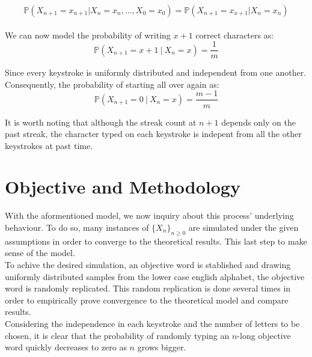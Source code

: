 \documentclass{article}
\newcommand{\SP}{\{X_n\}_{n\geq 0}}
\begin{document}
\begin{equation} \label{mkv_prop}
    \mathbb{P}(X_{n+1}=x_{n+1} | X_{n}=x_{n},\ldots, X_{0}=x_{0}) = \mathbb{P}(X_{n+1}=x_{x+1} | X_{n}=x_{n})
\end{equation}\\

We can now model the probability of writing $x+1$ correct characters as:
\begin{equation}
\mathbb{P}(X_{n+1} = x+1 \ | \ X_n=x) = \frac{1}{m}
\end{equation}

Since every keystroke is uniformly distributed and independent from one another. Consequently, the probability of starting all over again as:
\begin{equation}
\mathbb{P}(X_{n+1} = 0 \ | \ X_n=x) = \frac{m - 1}{m}
\end{equation}

It is worth noting that although the streak count at $n+1$ depends only on the past streak, the character typed on each keystroke is indepent from all the other keystrokes at past time.

\section{Objective and Methodology}
With the aformentioned model, we now inquiry about this process' underlying behaviour. To do so, many instances of $\SP$ are simulated under the given assumptions in order to converge to the theoretical results. This last step to make sense of the model.\\

To achive the desired simulation, an objective word is stablished and drawing uniformly distributed samples from the lower case english alphabet, the objective word is randomly replicated. This random replication is done several times in order to empirically prove convergence to the theoretical model and compare results.\\

Considering the independence in each keystroke and the number of letters to be chosen, it is clear that the probability of randomly typing an $n$-long objective word quickly decreases to zero as $n$ grows bigger.
\end{document}
